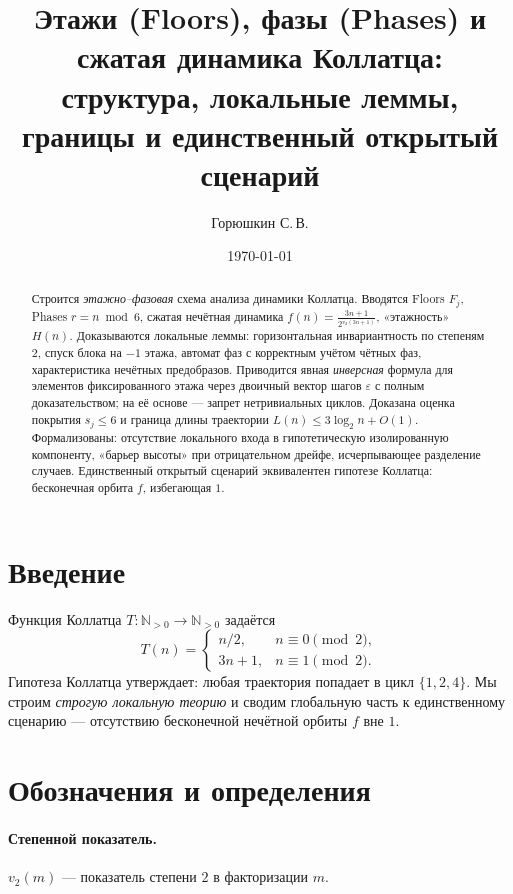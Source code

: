 \documentclass[a4paper,12pt]{article}
\title{Этажи (Floors), фазы (Phases) и сжатая динамика Коллатца:\\
структура, локальные леммы, границы и единственный открытый сценарий}
\author{Горюшкин С.\,В.}
\date{\today}
\theoremstyle{plain}
\theoremstyle{definition}
\begin{document}
\maketitle

\begin{abstract}
Строится \emph{этажно–фазовая} схема анализа динамики Коллатца. 
Вводятся Floors $F_j$, Phases $r=n\bmod 6$, сжатая нечётная динамика $f(n)=\frac{3n+1}{2^{v_2(3n+1)}}$, «этажность» $H(n)$. 
Доказываются локальные леммы: горизонтальная инвариантность по степеням $2$, спуск блока на $-1$ этажа, автомат фаз с корректным учётом чётных фаз, характеристика нечётных предобразов. 
Приводится явная \emph{инверсная} формула для элементов фиксированного этажа через двоичный вектор шагов $\varepsilon$ с полным доказательством; на её основе — запрет нетривиальных циклов. 
Доказана оценка покрытия $s_j\le 6$ и граница длины траектории $L(n)\le 3\log_2 n+O(1)$. 
Формализованы: отсутствие локального входа в гипотетическую изолированную компоненту, «барьер высоты» при отрицательном дрейфе, исчерпывающее разделение случаев. 
Единственный открытый сценарий эквивалентен гипотезе Коллатца: бесконечная орбита $f$, избегающая $1$.
\end{abstract}

\tableofcontents

\section{Введение}
Функция Коллатца $T:\mathbb N_{>0}\to\mathbb N_{>0}$ задаётся
\begin{equation}\label{eq:collatz}
T(n)=\begin{cases}
n/2,& n\equiv0\pmod2,\\[2pt]
3n+1,& n\equiv1\pmod2.
\end{cases}
\end{equation}
Гипотеза Коллатца утверждает: любая траектория попадает в цикл $\{1,2,4\}$. 
Мы строим \emph{строгую локальную теорию} и сводим глобальную часть к единственному сценарию — отсутствию бесконечной нечётной орбиты $f$ вне $1$.

\section{Обозначения и определения}\label{sec:defs}

\paragraph{Степенной показатель.} $v_2(m)$ — показатель степени $2$ в факторизации $m$.
\end{document}
